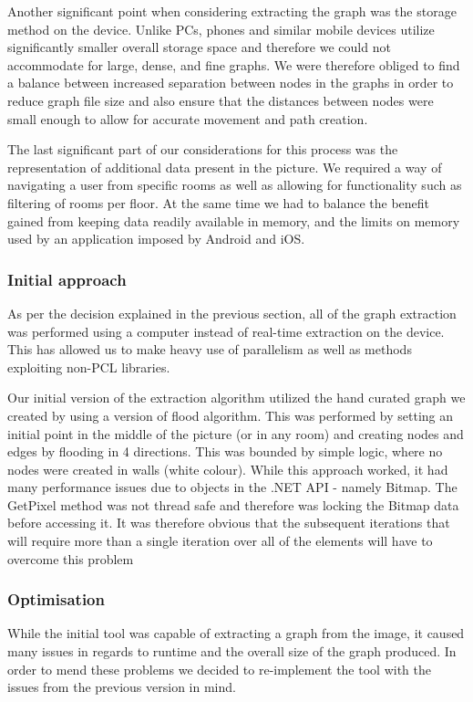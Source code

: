 \documentclass[12pt,a4paper]{report}
\begin{document}
Another significant point when considering extracting the graph was the storage method on the device. Unlike PCs, phones and similar mobile devices utilize significantly smaller overall storage space and therefore we could not accommodate for large, dense, and fine graphs. We were therefore obliged to find a balance between increased separation between nodes in the graphs in order to reduce graph file size and also ensure that the distances between nodes were small enough to allow for accurate movement and path creation.
\newline
	
The last significant part of our considerations for this process was the representation of additional data present in the picture. We required a way of navigating a user from specific rooms as well as allowing for functionality such as filtering of rooms per floor. At the same time we had to balance the benefit gained from keeping data readily available in memory, and the limits on memory used by an application imposed by Android and iOS.

\subsubsection{Initial approach}

As per the decision explained in the previous section, all of the graph extraction was performed using a computer instead of real-time extraction on the device. This has allowed us to make heavy use of parallelism as well as methods exploiting non-PCL libraries.
\newline
	
Our initial version of the extraction algorithm utilized the hand curated graph we created by using a version of flood algorithm. This was performed by setting an initial point in the middle of the picture (or in any room)  and creating nodes and edges by flooding in 4 directions. This was bounded by simple logic, where no nodes were created in walls (white colour). While this approach worked, it had many performance issues due to objects in the .NET API - namely Bitmap. The GetPixel method was not thread safe and therefore was locking the Bitmap data before accessing it. It was therefore obvious that the subsequent iterations that will require more than a single iteration over all of the elements will have to overcome this problem

\subsubsection{Optimisation}
While the initial tool was capable of extracting a graph from the image, it caused many issues in regards to runtime and the overall size of the graph produced. In order to mend these problems we decided to re-implement the tool with the issues from the previous version in mind. 
\end{document}
